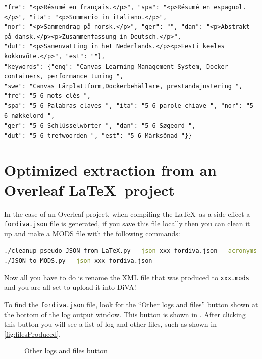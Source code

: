 \begin{lstlisting}
"fre": "<p>Résumé en français.</p>", "spa": "<p>Résumé en espagnol.</p>", "ita": "<p>Sommario in italiano.</p>",
"nor": "<p>Sammendrag på norsk.</p>", "ger": "", "dan": "<p>Abstrakt på dansk.</p><p>Zusammenfassung in Deutsch.</p>",
"dut": "<p>Samenvatting in het Nederlands.</p><p>Eesti keeles kokkuvõte.</p>", "est": ""},
"keywords": {"eng": "Canvas Learning Management System, Docker containers, performance tuning ",
"swe": "Canvas Lärplattform,Dockerbehållare, prestandajustering ", "fre": "5-6 mots-clés ",
"spa": "5-6 Palabras claves ", "ita": "5-6 parole chiave ", "nor": "5-6 nøkkelord ",
"ger": "5-6 Schlüsselwörter ", "dan": "5-6 Søgeord ",
"dut": "5-6 trefwoorden ", "est": "5-6 Märksõnad "}}
\end{lstlisting}
\FloatBarrier

\section{Optimized extraction from an Overleaf \LaTeX~project}
\label{sec:optimizeJSONToMods}
In the case of an Overleaf project, when compiling the \LaTeX~as a side-effect a \texttt{fordiva.json} file is generated, if you save this file locally then you can clean it up and make a MODS file with the following commands:
\begin{lstlisting}[language={bash}, caption={cleanup\_pseudo\_JSON-from\_LaTeX and JSON\_to\_MODS.p},label=lst:cleanPseudoJSONandConvertToMODS]
./cleanup_pseudo_JSON-from_LaTeX.py --json xxx_fordiva.json --acronyms acronyms.tex
./JSON_to_MODS.py --json xxx_fordiva.json
\end{lstlisting}

Now all you have to do is rename the XML file that was produced to \texttt{xxx.mods} and you are all set to upload it into DiVA!

To find the \texttt{fordiva.json} file, look for the “Other logs and files” button shown at the bottom of the log output window. This button is shown in . After clicking this button you will see a list of log and other files, such as shown in \ref{fig:filesProduced}.
	
\begin{figure}[!ht]
  \begin{center}
  \end{center}
  \caption{Other logs and files button}
  \label{fig:otherLogfiles}
\end{figure}

